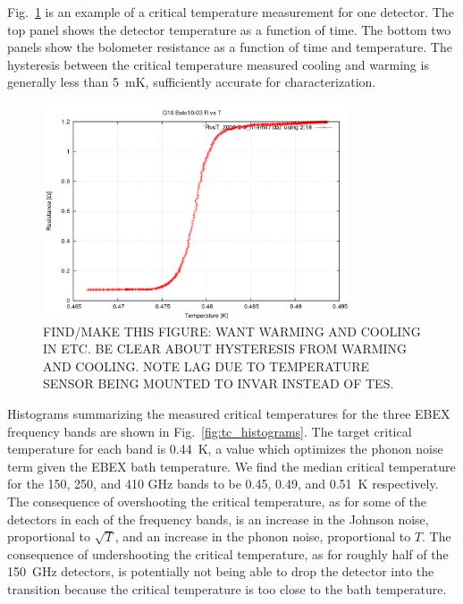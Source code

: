 Fig.~\ref{fig:tc_measurement} is an example of a critical temperature measurement for one detector. 
The top panel shows the detector temperature as a function of time. %
The bottom two panels show the bolometer resistance as a function of time and temperature. 
The hysteresis between the critical temperature measured cooling and warming is generally less than 5~mK, sufficiently accurate for characterization.

\begin{figure}[htbp]
\begin{center}
\includegraphics[height=2.5in]{figures/G18_bolo10-03_RvsT_oral}
\caption{FIND/MAKE THIS FIGURE: WANT WARMING AND COOLING IN ETC. BE CLEAR ABOUT HYSTERESIS FROM WARMING AND COOLING. NOTE LAG DUE TO TEMPERATURE SENSOR BEING MOUNTED TO INVAR INSTEAD OF TES.
\label{fig:tc_measurement} }
\end{center}
\end{figure} 

Histograms summarizing the measured critical temperatures for the three \ac{EBEX} frequency bands are shown in Fig.~\ref{fig:tc_histograms}. 
The target critical temperature for each band is 0.44~K, a value which optimizes the phonon noise term given the \ac{EBEX} bath temperature. %
We find the median critical temperature for the 150, 250, and 410 GHz bands to be 0.45, 0.49, and 0.51~K respectively.  
The consequence of overshooting the critical temperature, as for some of the detectors in each of the frequency bands, is an increase in the Johnson noise, proportional to $\sqrt{T}$, and an increase in the phonon noise, proportional to $T$. 
The consequence of undershooting the critical temperature, as for roughly half of the 150~GHz detectors, is potentially not being able to drop the detector into the transition because the critical temperature is too close to the bath temperature. %

